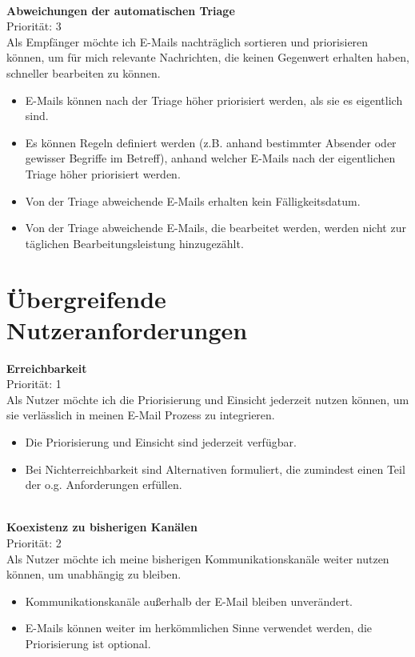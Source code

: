 \noindent
\\ \textbf{Abweichungen der automatischen Triage} \\
Priorität: 3 \\
Als Empfänger möchte ich E-Mails nachträglich sortieren und priorisieren können, um für mich relevante Nachrichten, die keinen Gegenwert erhalten haben, schneller bearbeiten zu können.
\begin{itemize}
    \item E-Mails können nach der Triage höher priorisiert werden, als sie es eigentlich sind.
    \item Es können Regeln definiert werden (z.B. anhand bestimmter Absender oder gewisser Begriffe im Betreff), anhand welcher E-Mails nach der eigentlichen Triage höher priorisiert werden.
    \item Von der Triage abweichende E-Mails erhalten kein Fälligkeitsdatum.
    \item Von der Triage abweichende E-Mails, die bearbeitet werden, werden nicht zur täglichen Bearbeitungsleistung hinzugezählt.
\end{itemize}

\section{Übergreifende Nutzeranforderungen}

\textbf{Erreichbarkeit} \\
Priorität: 1 \\
Als Nutzer möchte ich die Priorisierung und Einsicht jederzeit nutzen können, um sie verlässlich in meinen E-Mail Prozess zu integrieren.
\begin{itemize}
    \item Die Priorisierung und Einsicht sind jederzeit verfügbar.
    \item Bei Nichterreichbarkeit sind Alternativen formuliert, die zumindest einen Teil der o.g. Anforderungen erfüllen.
\end{itemize}

\noindent
\\ \textbf{Koexistenz zu bisherigen Kanälen} \\
Priorität: 2 \\
Als Nutzer möchte ich meine bisherigen Kommunikationskanäle weiter nutzen können, um unabhängig zu bleiben.
\begin{itemize}
    \item Kommunikationskanäle außerhalb der E-Mail bleiben unverändert.
    \item E-Mails können weiter im herkömmlichen Sinne verwendet werden, die Priorisierung ist optional.
\end{itemize}

